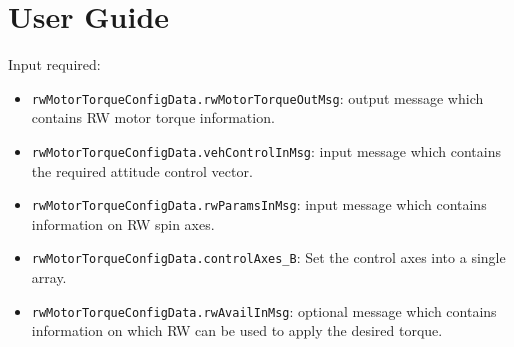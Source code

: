 

\section{User Guide}
Input required: 
\begin{itemize}
\item  \verb~rwMotorTorqueConfigData.rwMotorTorqueOutMsg~: output message which contains RW motor torque information.
\item  \verb~rwMotorTorqueConfigData.vehControlInMsg~:  input message which contains the required attitude control vector.
\item  \verb~rwMotorTorqueConfigData.rwParamsInMsg~:  input message which contains information on RW spin axes.
\item \verb~rwMotorTorqueConfigData.controlAxes_B~: Set the control axes into a single array.

\item  \verb~rwMotorTorqueConfigData.rwAvailInMsg~:  optional message  which contains information on which RW can be used to apply the desired torque. 



\end{itemize}
